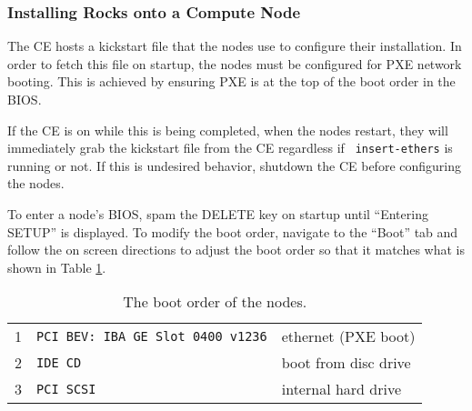 \documentclass[12pt]{article}
\begin{document}
\subsubsection{Installing Rocks onto a Compute Node}

\qq The CE hosts a kickstart file that the nodes use to configure their
installation. In order to fetch this file on startup, the nodes must be
configured for PXE network booting. This is achieved by ensuring PXE is at the
top of the boot order in the BIOS.

\begin{tcolorbox}[title=NOTE, colback=white, colframe=blue]
  If the CE is on while this is being completed, when the nodes restart,
  they will immediately grab the kickstart file from the CE regardless if {\tt
    insert-ethers} is running or not. If this is undesired behavior, shutdown the
  CE before configuring the nodes.
\end{tcolorbox}


\qq To enter a node's BIOS, spam the DELETE key on startup until ``Entering
SETUP'' is displayed. To modify the boot order, navigate to the ``Boot'' tab and
follow the on screen directions to adjust the boot order so that it matches what
is shown in Table \ref{tab:bootOrderNodes}.

\begin{table}[H]
  \caption{The boot order of the nodes.}
  \begin{center}
    \begin{tabular}{|l|l|l|}
      \hline
      1 & {\tt PCI BEV: IBA GE Slot 0400 v1236} & ethernet (PXE boot) \\
      2 & {\tt IDE CD} & boot from disc drive \\
      3 & {\tt PCI SCSI} & internal hard drive \\
      \hline
    \end{tabular}
  \end{center}
  \label{tab:bootOrderNodes}
\end{table}
\end{document}
